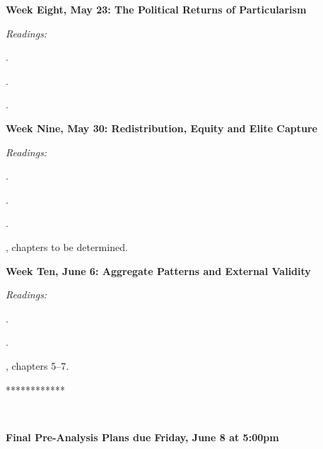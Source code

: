 \documentclass[11pt]{article}
\begin{document}
\textbf{Week Eight, May 23: The Political Returns of Particularism}

\textit{Readings:}

\href{doi: 10.1177/0010414009332126}{}.

\href{DOI: 10.1111/j.1540-5907.2012.00617.x}{}.

\href{http://www.jstor.org/stable/23496658}{}.


\textbf {Week Nine, May 30: Redistribution, Equity and Elite Capture}

\textit{Readings:}

\href{doi:10.1016/j.jdeveco.2006.01.004}{}.

\href{http://www.jstor.org/stable/40060150}{}.

\href{http://www.nber.org/papers/w18798}{}.

, chapters to be determined.

\textbf{Week Ten, June 6: Aggregate Patterns and External Validity}

\textit{Readings:}

\href{DOI: 10.1111/j.1542-4774.2012.01092.x}{}.

\href{DOI: 10.1111/j.1540-5907.2006.00220.x}{}.

, chapters 5--7. 

\centerline{************}\\
\bigskip
\centerline{\textbf{Final Pre-Analysis Plans due Friday, June 8 at 5:00pm}}
\end{document}
